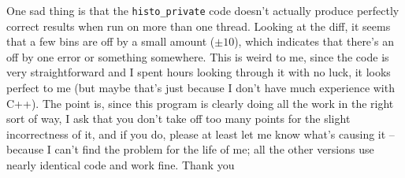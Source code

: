 \documentclass[letterpaper]{article}
\begin{document}
	One sad thing is that the \verb|histo_private| code doesn't actually produce perfectly correct results when run on more than one thread. Looking at the diff, it seems that a few bins are off by a small amount ($\pm 10$), which indicates that there's an off by one error or something somewhere. This is weird to me, since the code is very straightforward and I spent hours looking through it with no luck, it looks perfect to me (but maybe that's just because I don't have much experience with C++). The point is, since this program is clearly doing all the work in the right sort of way, I ask that you don't take off too many points for the slight incorrectness of it, and if you do, please at least let me know what's causing it -- because I can't find the problem for the life of me; all the other versions use nearly identical code and work fine. Thank you
\end{document}
